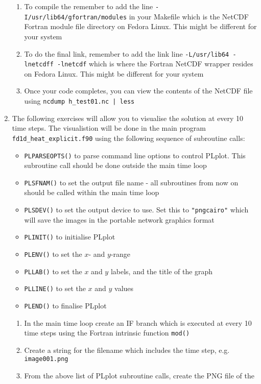 \documentclass[12pt]{article}
\begin{document}
\begin{enumerate}
\begin{enumerate}
\item To compile the remember to add the line \texttt{-I/usr/lib64/gfortran/modules} in your
  Makefile which is the NetCDF Fortran module file directory on Fedora Linux. This might be
  different for your system
\item To do the final link, remember to add the link line \texttt{-L/usr/lib64 -lnetcdff -lnetcdf}
  which is where the Fortran NetCDF wrapper resides on Fedora Linux. This might be different
  for your system
\item Once your code completes, you can view the contents of the NetCDF file using \texttt{ncdump h\_test01.nc | less}
\end{enumerate}
\item The following exercises will allow you to visualise the solution at every 10 time steps. The
visualistion will be done in the main program \texttt{fd1d\_heat\_explicit.f90} using the
following sequence of subroutine calls:
\begin{itemize}
\item\texttt{PLPARSEOPTS()} to parse command line options to control PLplot. This subroutine
call should be done outside the main time loop
\item\texttt{PLSFNAM()} to set the output file name - all subroutines from now on should be
called within the main time loop
\item\texttt{PLSDEV()} to set the output device to use. Set this to \texttt{"pngcairo"} which
will save the images in the portable network graphics format
\item\texttt{PLINIT()} to initialise PLplot
\item\texttt{PLENV()} to set the $x$- and $y$-range
\item\texttt{PLLAB()} to set the $x$ and $y$ labels, and the title of the graph
\item\texttt{PLLINE()} to set the $x$ and $y$ values
\item\texttt{PLEND()} to finalise PLplot
\end{itemize}  
\begin{enumerate}
\item In the main time loop create an IF branch which is executed at every 10 time steps
using the Fortran intrinsic function \texttt{mod()}
\item Create a string for the filename which includes the time step, e.g. 
\texttt{image001.png}
\item From the above list of PLplot subroutine calls, create the PNG file of the

\end{enumerate}
\end{enumerate}
\end{document}
